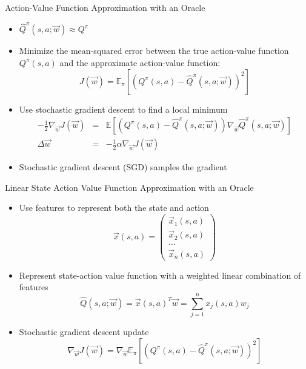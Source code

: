 \begin{frame}[c]{Action-Value Function Approximation with an Oracle}
	
	\begin{itemize}
		\item $\hat{Q}^\pi(s,a;\vec{w}) \approx Q^\pi$
		\item Minimize the mean-squared error between the true action-value function $Q^\pi(s,a)$ and the approximate action-value function:
		$$J(\vec{w}) = \mathbb{E}_\pi [(Q^\pi(s,a) - \hat{Q}^\pi(s,a;\vec{w}))^2] $$
		\item Use stochastic gradient descent to find a local minimum
		\begin{eqnarray}
			-\frac{1}{2}\nabla_\vec{w} J(\vec{w}) &=& \mathbb{E}\left[ (Q^\pi(s,a) - \hat{Q}^\pi(s,a;\vec{w})) \nabla_\vec{w} \hat{Q}^\pi(s,a;\vec{w}) \right]\nonumber\\
			\Delta \vec{w} &=& -\frac{1}{2}\alpha\nabla_\vec{w} J(\vec{w})\nonumber
		\end{eqnarray}
		\item Stochastic gradient descent (SGD) samples the gradient
	\end{itemize}
	
\end{frame}
\begin{frame}[c]{Linear State Action Value Function Approximation with an
		Oracle}
	
	\begin{itemize}
		\item Use features to represent both the state and action
		$$\vec{x}(s,a) = \begin{pmatrix}
		\vec{x}_1(s,a)\\
		\vec{x}_2(s,a)\\
		\ldots\\
		\vec{x}_n(s,a)
		\end{pmatrix} $$
		\item Represent state-action value function with a weighted linear
		combination of features
		$$\hat{Q}(s,a;\vec{w}) = \vec{x}(s,a)^T \vec{w} = \sum_{j=1}^n x_j(s,a)w_j $$
		\item Stochastic gradient descent update
		$$\nabla_{\vec{w}} J(\vec{w}) = \nabla_{\vec{w}} \mathbb{E}_\pi [(Q^\pi(s,a) - \hat{Q}^\pi(s,a;\vec{w}))^2] $$
	\end{itemize}
	
\end{frame}
